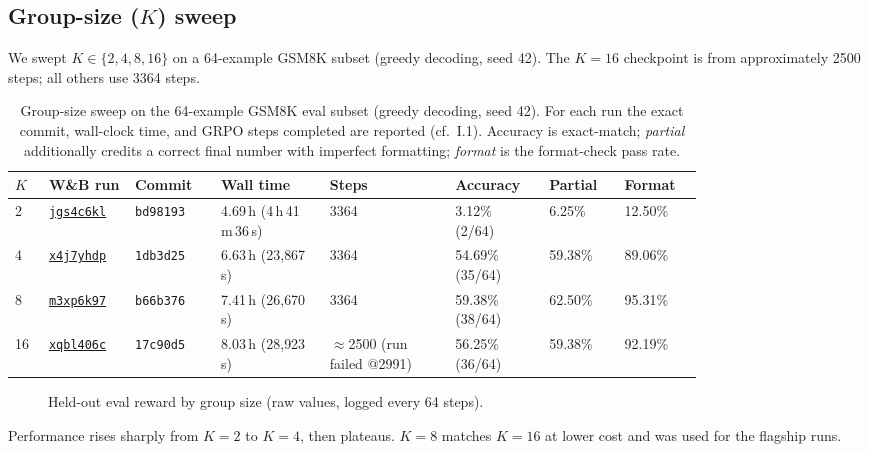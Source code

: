 \subsection{Group-size ($K$) sweep}

We swept $K \in \{2,4,8,16\}$ on a 64-example GSM8K subset (greedy decoding, seed 42).
The $K=16$ checkpoint is from approximately 2500 steps; all others use 3364 steps.

\begin{table}[htbp]
\centering
\scriptsize
\setlength{\tabcolsep}{4pt}
\begin{tabular}{@{}L{0.04\linewidth}L{0.10\linewidth}L{0.10\linewidth}L{0.13\linewidth}L{0.15\linewidth}L{0.10\linewidth}L{0.09\linewidth}L{0.09\linewidth}@{}}
\toprule
$K$ & W\&B run & Commit & Wall time & Steps & Accuracy & Partial & Format \\
  & \href{https://wandb.ai/felsomoye-university-of-cambridge/tunix/runs/jgs4c6kl}{\texttt{jgs4c6kl}} & \texttt{bd98193} & 4.69\,h (4\,h\,41\,m\,36\,s)  & 3364 & 3.12\% (2/64)   & 6.25\%  & 12.50\% \\
4  & \href{https://wandb.ai/felsomoye-university-of-cambridge/tunix/runs/x4j7yhdp}{\texttt{x4j7yhdp}} & \texttt{1db3d25} & 6.63\,h (23{,}867\,s)  & 3364 & 54.69\% (35/64) & 59.38\% & 89.06\% \\
8  & \href{https://wandb.ai/felsomoye-university-of-cambridge/tunix/runs/m3xp6k97}{\texttt{m3xp6k97}} & \texttt{b66b376} & 7.41\,h (26{,}670\,s)  & 3364 & 59.38\% (38/64) & 62.50\% & 95.31\% \\
16 & \href{https://wandb.ai/felsomoye-university-of-cambridge/tunix/runs/xqbl406c}{\texttt{xqbl406c}} & \texttt{17c90d5} & 8.03\,h (28{,}923\,s)  & $\approx$2500 (run failed @2991) & 56.25\% (36/64) & 59.38\% & 92.19\% \\
\bottomrule
\end{tabular}
\caption{Group-size sweep on the 64-example GSM8K eval subset (greedy decoding, seed 42).
For each run the exact commit, wall-clock time, and GRPO steps completed are reported (cf.\
I.1). Accuracy is exact-match; \emph{partial} additionally credits a correct final number with
imperfect formatting; \emph{format} is the format-check pass rate.}
\label{tab:ksweep}
\end{table}

\begin{figure}[htbp]
\caption{Held-out eval reward by group size (raw values, logged every 64 steps).}
\label{fig:ksweep-eval-reward}
\end{figure}

\noindent
Performance rises sharply from $K=2$ to $K=4$, then plateaus. $K=8$ matches $K=16$ at
lower cost and was used for the flagship runs.

